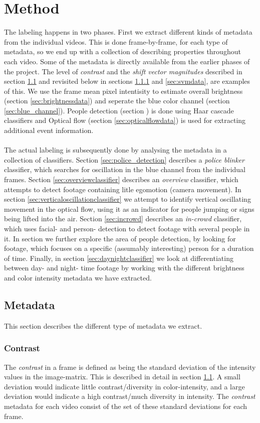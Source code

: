 \section{Method}
%
The labeling happens in two phases. First we extract different kinds of metadata from the individual videos. This is done frame-by-frame, for each type of metadata, so we end up with a collection of describing properties throughout each video. Some of the metadata is directly available from the earlier phases of the project. The level of \textit{contrast} and the \textit{shift vector magnitudes} described in section \ref{} and revisited below in sections \ref{sec:contrastdata} and \ref{sec:svmdata}, are examples of this. We use the frame mean pixel intentisity to estimate overall brightness (section \ref{sec:brightnessdata}) and seperate the blue color channel (section \ref{sec:blue_channel}). People detection (section \label{sec:peopledata}) is done using Haar cascade classifiers and Optical flow (section \ref{sec:opticalflowdata}) is used for extracting additional event information.\\
\\
The actual labeling is subsequently done by analysing the metadata in a collection of classifiers. Section \ref{sec:police_detection} describes a \textit{police blinker} classifier, which searches for oscillation in the blue channel from the individual frames. Section \ref{sec:overviewclassifier} describes an \textit{overview} classifier, which attempts to detect footage containing litle egomotion (camera movement). In section \ref{sec:verticaloscillationclassifier} we attempt to identify vertical oscillating movement in the optical flow, using it as an indicator for people jumping or signs being lifted into the air. Section \ref{sec:incrowd} describes an \textit{in-crowd} classifier, which uses facial- and person- detection to detect footage with several people in it. In section \label{sec:infocus} we further explore the area of people detection, by looking for footage, which focuses on a specific (assumably interesting) person for a duration of time. Finally, in section \ref{sec:daynightclassifier} we look at differentiating between day- and night- time footage by working with the different brightness and color intensity metadata we have extracted.
%
\subsection{Metadata}
%
This section describes the different type of metadata we extract.
%
\subsubsection{Contrast}\label{sec:contrastdata}
%
The \textit{contrast} in a frame is defined as being the standard deviation of the intensity values in the image-matrix. This is described in detail in section \ref{}. A small deviation would indicate little contrast/diversity in color-intensity, and a large deviation would indicate a high contrast/much diversity in intensity. The \textit{contrast} metadata for each video consist of the set of these standard deviations for each frame.
%
